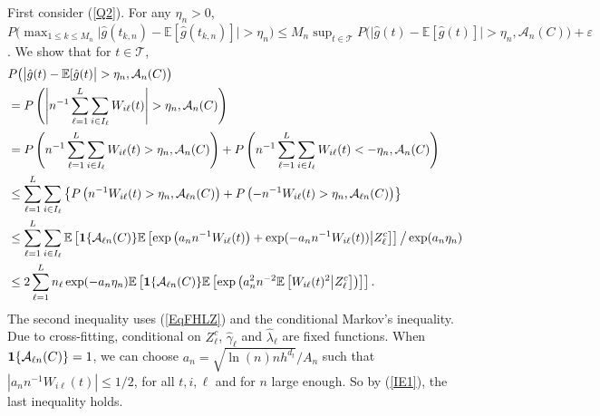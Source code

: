 \documentclass[lettersize, 12pt]{article}
\begin{document}
{First consider (\ref{Q2}).
For any $\eta_n > 0$, $P\big(\max_{1 \leq k \leq M_n} \big| 
\hat g(t_{k,n}) - \mathbb{E}[\hat g(t_{k,n})] \big| > \eta_n \big)
\leq M_n \sup_{t\in\mathcal{T}} P\big( \big| \hat g(t) - \mathbb{E}[\hat g(t)]\big| > \eta_n, \mathcal{A}_n(C)
 \big) + \varepsilon$.
We show that 
for $t \in\mathcal{T}$,
\begin{align}
&P\big( \big| \hat g(t) - \mathbb{E}[\hat g(t) \big| > \eta_n, \mathcal{A}_n(C) \big) 
\notag\\
& = P\left( \left| n^{-1}\sum_{\ell = 1}^L \sum_{i \in I_\ell} W_{i\ell}(t) \right| > \eta_n, \mathcal{A}_n(C)\right)
\notag\\
& = P\left(  n^{-1}\sum_{\ell = 1}^L \sum_{i \in I_\ell} W_{i\ell}(t)  > \eta_n, \mathcal{A}_n(C)\right)
+ P\left(  n^{-1}\sum_{\ell = 1}^L \sum_{i \in I_\ell} W_{i\ell}(t)  < - \eta_n, \mathcal{A}_n(C)\right)
\notag\\
& \leq \sum_{\ell = 1}^L \sum_{i \in I_\ell} \left\{ P\left(  n^{-1}W_{i\ell}(t)  > \eta_n, \mathcal{A}_{\ell n}(C)\right)
+ P\left(  - n^{-1}  W_{i\ell}(t)  >  \eta_n, \mathcal{A}_{\ell n}(C)\right)\right\}
\notag\\
&\leq \sum_{\ell = 1}^L \sum_{i \in I_\ell} \mathbb{E}\left[ {\bf 1}\{\mathcal{A}_{\ell n}(C)\}  \mathbb{E}\left[\exp\left(a_n n^{-1}W_{i\ell}(t)\right) + \exp( - a_n n^{-1} W_{i\ell}(t))\big| Z_\ell^c\right] \right] \big/\exp(a_n \eta_n)  
\notag\\
&\leq 2 \sum_{\ell = 1}^L n_\ell \exp(-a_n \eta_n)  \mathbb{E}\left[ {\bf 1}\{\mathcal{A}_{\ell n}(C)\}  \mathbb{E}\left[\exp\left(a_n^2 n^{-2}  \mathbb{E}\left[W_{i\ell}(t)^2\big| Z_\ell^c\right]\right)\right]\right].
\label{Ecover}
\end{align}
The second inequality uses (\ref{EqFHLZ}) and the conditional Markov's inequality.
Due to cross-fitting, conditional on $Z_\ell^c$, $\hat \gamma_\ell$ and $\hat\lambda_\ell$ are fixed functions. 
When ${\bf 1}\{\mathcal{A}_{\ell n}(C)\} = 1$, 
we can choose $a_n = \sqrt{\ln(n) nh^{d_t}} /A_n$ such that $\left| a_n n^{-1} W_{i\ell}(t)\right| \leq 1/2$, for all $t, i, \ell$ and for $n$ large enough.
So by (\ref{IE1}), the last inequality holds.

}
\end{document}
